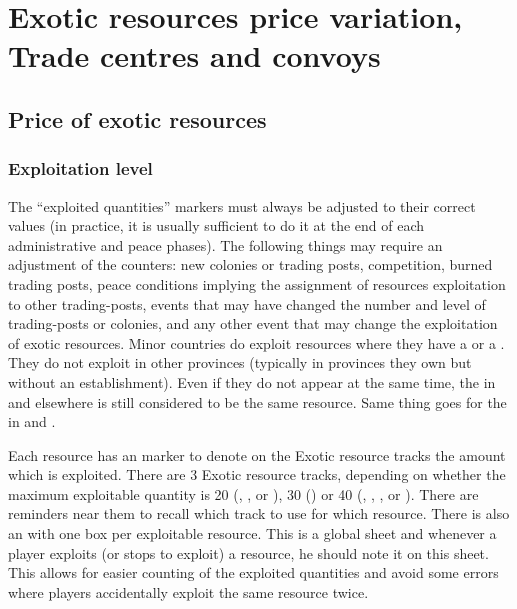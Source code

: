 \section{Exotic resources price variation, Trade centres and convoys}
\label{chExpenses:Variation}



\subsection{Price of exotic resources}
\label{chExpenses:ExoticResourcesPrices}


\subsubsection{Exploitation level}
 The ``exploited quantities'' markers must
always be adjusted to their correct values (in practice, it is usually
sufficient to do it at the end of each administrative and peace phases).
\bparag The following things may require an adjustment of the counters: new
colonies or trading posts, competition, burned trading posts, peace conditions
implying the assignment of resources exploitation to other trading-posts,
events that may have changed the number and level of trading-posts or
colonies, and any other event that may change the exploitation of exotic
resources.
\bparag Minor \ROTW countries do exploit resources where they have a \TP or a
\COL. They do not exploit in other provinces (typically in provinces they own
but without an establishment).
\bparag Even if they do not appear at the same time, the  in
 and elsewhere is still considered to be the same
resource. Same thing goes for the  in  and
.

 Each resource has an  marker to denote on the Exotic resource tracks the amount which is
exploited.
\bparag There are 3 Exotic resource tracks, depending on whether the maximum
exploitable quantity is 20 (, , 
or ), 30 () or 40 (, ,
,  or ). There are reminders near them to
recall which track to use for which resource.
\bparag There is also an  with one box per
exploitable resource. This is a global sheet and whenever a player exploits
(or stops to exploit) a resource, he should note it on this sheet. This allows
for easier counting of the exploited quantities and avoid some errors where
players accidentally exploit the same resource twice.

